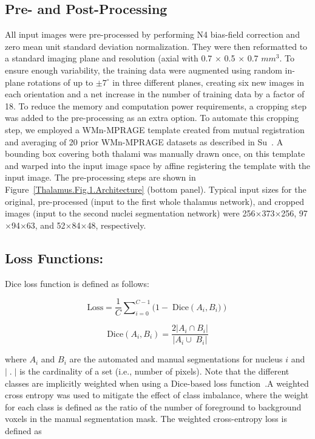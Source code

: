 \subsection{Pre- and Post-Processing}
All input images were pre-processed by performing N4 bias-field correction and zero mean unit standard deviation normalization. They were then reformatted to a standard imaging plane and resolution (axial with 0.7 $\times$ 0.5 $\times$ 0.7 $mm^3$. To ensure enough variability, the training data were augmented using random in-plane rotations of up to $\pm7^\circ $ in three different planes, creating six new images in each orientation and a net increase in the number of training data by a factor of 18. To reduce the memory and computation power requirements, a cropping step was added to the pre-processing as an extra option. To automate this cropping step, we employed a WMn-MPRAGE template created from mutual registration and averaging of 20 prior WMn-MPRAGE datasets as described in Su~\cite{1921968:27964332}. A bounding box covering both thalami was manually drawn once, on this template and warped into the input image space by affine registering the template with the input image. The pre-processing steps are shown in Figure~\ref{Thalamus.Fig.1.Architecture}  (bottom panel). Typical input sizes for the original, pre-processed (input to the first whole thalamus network), and cropped images (input to the second nuclei segmentation network) were 256$\times$373$\times$256, 97$\times$94$\times$63, and 52$\times$84$\times$48, respectively.

\subsection{Loss Functions:}

Dice loss function is defined as follows:

\begin{equation}
\label{Thalamus.Eq.1.LossDice}
\text{Loss} = \frac{1}{C}{\sum\nolimits_{i=0}^{C-1}{(1-\;\text{Dice}\left(A_i,B_i)\right)}}
\end{equation}



\begin{equation}
\label{Thalamus.Eq.2.Dice}
\text{Dice}\left(A_i,B_i\right) = \frac{2\left\vert A_i\cap B_i\right\vert}{\left\vert A_i\cup\;B_i\right\vert}
\end{equation}

where $A_i $ and $B_i $ are the automated and manual segmentations for nucleus $i $ and $\vert\;.\;\vert $ is the cardinality of a set (i.e., number of pixels). Note that the different classes are implicitly weighted when using a Dice-based loss function~\cite{1921968:27964315,1921968:27964354}.A weighted cross entropy was used to mitigate the effect of class imbalance, where the weight for each class is defined as the ratio of the number of foreground to background voxels in the manual segmentation mask. The weighted cross-entropy loss is defined as

